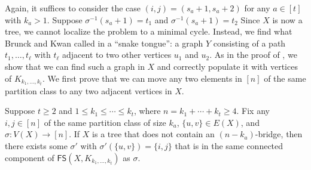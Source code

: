 \documentclass{mystyle}
\newcommand{\FS}{\mathsf{FS}}
\begin{document}
Again, it suffices to consider the case $(i, j) = (s_a + 1, s_a + 2)$ for any $a \in [t]$ with $k_a > 1$. Suppose $\sigma^{-1}(s_a + 1) = t_1$ and $\sigma^{-1}(s_a + 1) = t_2$ Since $X$ is now a tree, we cannot localize the problem to a minimal cycle. Instead, we find what Brunck and Kwan called in \cite{brunck2023} a ``snake tongue'': a graph $Y$ consisting of a path $t_1, \ldots, t_\ell$ with $t_\ell$ adjacent to two other vertices $u_1$ and $u_2$. As in the proof of , we show that we can find such a graph in $X$ and correctly populate it with vertices of $K_{k_1, \ldots, k_t}$. We first prove that we can move any two elements in $[n]$ of the same partition class to any two adjacent vertices in $X$.

\begin{lemma}\label{lem_tree_move_anywhere}
    Suppose $t \geq 2$ and $1 \leq k_1 \leq \cdots \leq k_t$, where $n = k_1 + \cdots + k_t \geq 4$. Fix any $i, j \in [n]$ of the same partition class of size $k_a$, $\{u, v\} \in E(X)$, and $\sigma: V(X) \to [n]$. If $X$ is a tree that does not contain an $(n - k_a)$-bridge, then there exists some $\sigma'$ with $\sigma'(\{u, v\}) = \{i, j\}$ that is in the same connected component of $\FS(X, K_{k_1, \ldots, k_t})$ as $\sigma$. 
\end{lemma}
\end{document}
